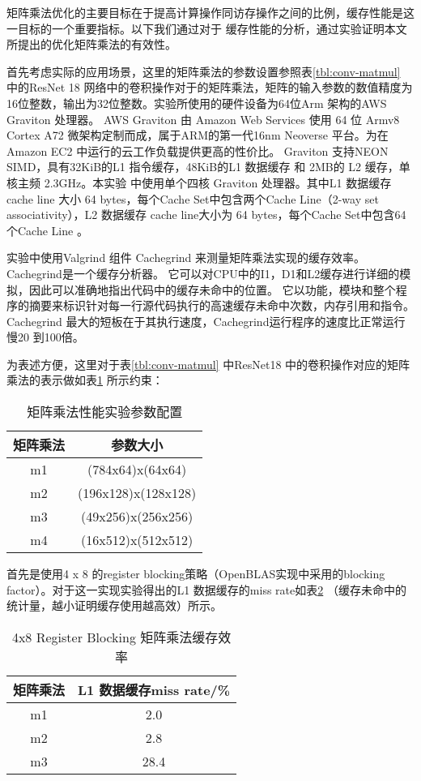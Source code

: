矩阵乘法优化的主要目标在于提高计算操作同访存操作之间的比例，缓存性能是这一目标的一个重要指标。以下我们通过对于
缓存性能的分析，通过实验证明本文所提出的优化矩阵乘法的有效性。

首先考虑实际的应用场景，这里的矩阵乘法的参数设置参照表\ref{tbl:conv-matmul} 中的ResNet 18 网络中的卷积操作对于的矩阵乘法，矩阵的输入参数的数值精度为16位整数，输出为32位整数。实验所使用的硬件设备为64位Arm 架构的AWS Graviton 处理器。
AWS Graviton 由 Amazon Web Services 使用 64 位 Armv8 Cortex A72 微架构定制而成，属于ARM的第一代16nm Neoverse 平台。为在 Amazon EC2 中运行的云工作负载提供更高的性价比。
Graviton 支持NEON SIMD，具有32KiB的L1 指令缓存，48KiB的L1 数据缓存 和 2MB的 L2 缓存，单核主频 2.3GHz。本实验
中使用单个四核 Graviton 处理器。其中L1 数据缓存cache line 大小 64 bytes，每个Cache Set中包含两个Cache Line（2-way set associativity），L2 数据缓存 cache line大小为 64 bytes，每个Cache Set中包含64个Cache Line 。

实验中使用Valgrind 组件 Cachegrind 来测量矩阵乘法实现的缓存效率。Cachegrind是一个缓存分析器。 它可以对CPU中的I1，D1和L2缓存进行详细的模拟，因此可以准确地指出代码中的缓存未命中的位置。 它以功能，模块和整个程序的摘要来标识针对每一行源代码执行的高速缓存未命中次数，内存引用和指令。 Cachegrind 最大的短板在于其执行速度，Cachegrind运行程序的速度比正常运行慢20 到100倍。

为表述方便，这里对于表\ref{tbl:conv-matmul} 中ResNet18 中的卷积操作对应的矩阵乘法的表示做如表\ref{tbl:matmul-anno} 所示约束：

\begin{table}[]
  \centering
  \caption{矩阵乘法性能实验参数配置}
  \begin{tabular}{cc}
    \toprule
    矩阵乘法 & 参数大小\\
    \midrule
    m1  & (784x64)x(64x64)\\
    m2  & (196x128)x(128x128)\\
    m3  & (49x256)x(256x256)\\
    m4  & (16x512)x(512x512)\\
    \bottomrule
  \end{tabular}
  \label{tbl:matmul-anno}
\end{table}

首先是使用4 x 8 的register blocking策略（OpenBLAS实现中采用的blocking factor）。对于这一实现实验得出的L1 数据缓存的miss rate如表\ref{tbl:4x8d1mr} （缓存未命中的统计量，越小证明缓存使用越高效）所示。

\begin{table}[]
  \centering
  \caption{4x8 Register Blocking 矩阵乘法缓存效率}
  \begin{tabular}{cc}
    \toprule
    矩阵乘法 & L1 数据缓存miss rate/\% \\
    \midrule
    m1  & 2.0 \\
    m2  & 2.8 \\
    m3  & 28.4 \\
    \bottomrule
  \end{tabular}
  \label{tbl:4x8d1mr}
\end{table}

